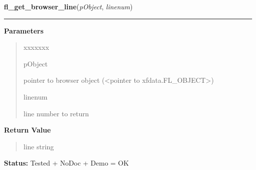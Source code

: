 \hspace{.8\funcindent}\begin{boxedminipage}{\funcwidth}

    \raggedright \textbf{fl\_get\_browser\_line}(\textit{pObject}, \textit{linenum})

    \vspace{-1.5ex}

    \rule{\textwidth}{0.5\fboxrule}
\setlength{\parskip}{2ex}
\setlength{\parskip}{1ex}
      \textbf{Parameters}
      \vspace{-1ex}

      \begin{quote}
        \begin{Ventry}{xxxxxxx}

          \item[pObject]

          pointer to browser object ({\textless}pointer to 
          xfdata.FL\_OBJECT{\textgreater})

          \item[linenum]

          line number to return

        \end{Ventry}

      \end{quote}

      \textbf{Return Value}
    \vspace{-1ex}

      \begin{quote}
      line string

      \end{quote}

\textbf{Status:} Tested + NoDoc + Demo = OK



    \end{boxedminipage}

    \label{xformslib:library:fl_load_browser}

    \vspace{0.5ex}

